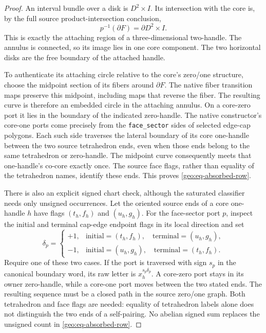 \begin{proof}
An interval bundle over a disk is $D^2\times I$.  Its intersection with the
core is, by the full source product-intersection conclusion,
\[
 p^{-1}(\partial F)=\partial D^2\times I.
\]
This is exactly the attaching region of a three-dimensional two-handle.
The annulus is connected, so its image lies in one core component.  The
two horizontal disks are the free boundary of the attached handle.

To authenticate its attaching circle relative to the core's zero/one
structure, choose the midpoint section of its fibers around $\partial F$.
The native fiber transition maps preserve this midpoint, including maps
that reverse the fiber.  The resulting curve is therefore an embedded
circle in the attaching annulus.  On a core-zero port it lies in the
boundary of the indicated zero-handle.  The native constructor's
core-one ports come precisely from the \texttt{face\_sector} sides of
selected edge-cap polygons.  Each such side traverses the lateral boundary
of its core one-handle between the two source tetrahedron ends, even when
those ends belong to the same tetrahedron or zero-handle.  The midpoint
curve consequently meets that one-handle's co-core exactly once.  The
source face flags, rather than equality of the tetrahedron names, identify
these ends.  This proves \eqref{geo:eq-absorbed-row}.

There is also an explicit signed chart check, although the saturated
classifier needs only unsigned occurrences.  Let the oriented source ends
of a core one-handle $h$ have flags $(t_h,f_h)$ and $(u_h,g_h)$.  For the
face-sector port $p$, inspect the initial and terminal cap-edge endpoint
flags in its local direction and set
\[
 \delta_p=
 \begin{cases}
 +1,&\text{initial}=(t_h,f_h),\quad\text{terminal}=(u_h,g_h),\\
 -1,&\text{initial}=(u_h,g_h),\quad\text{terminal}=(t_h,f_h).
 \end{cases}
 \tag{G10}\label{geo:eq-port-sign}
\]
Require one of these two cases.  If the port is traversed with sign $s_p$
in the canonical boundary word, its raw letter is $x_h^{s_p\delta_p}$.
A core-zero port stays in its owner zero-handle, while a core-one port
moves between the two stated ends.  The resulting sequence must be a
closed path in the source zero/one graph.  Both tetrahedron and face flags
are needed: equality of tetrahedron labels alone does not distinguish the
two ends of a self-pairing.  No abelian signed sum replaces the unsigned
count in \eqref{geo:eq-absorbed-row}.


\end{proof}
